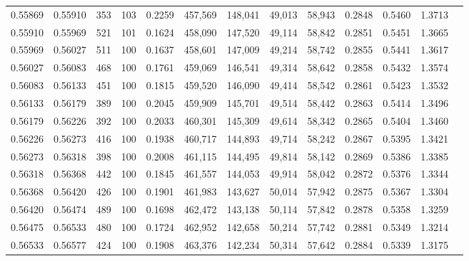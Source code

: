 \begin{tabular}{rrrrrrrrrrrrr}
0.55869 & 0.55910 &   353 & 103 &                                     0.2259 & 457,569 & 148,041 &  49,013 &  58,943 & 0.2848 & 0.5460 & 1.3713 \\
0.55910 & 0.55969 &   521 & 101 &                                     0.1624 & 458,090 & 147,520 &  49,114 &  58,842 & 0.2851 & 0.5451 & 1.3665 \\
0.55969 & 0.56027 &   511 & 100 &                                     0.1637 & 458,601 & 147,009 &  49,214 &  58,742 & 0.2855 & 0.5441 & 1.3617 \\
0.56027 & 0.56083 &   468 & 100 &                                     0.1761 & 459,069 & 146,541 &  49,314 &  58,642 & 0.2858 & 0.5432 & 1.3574 \\
0.56083 & 0.56133 &   451 & 100 &                                     0.1815 & 459,520 & 146,090 &  49,414 &  58,542 & 0.2861 & 0.5423 & 1.3532 \\
0.56133 & 0.56179 &   389 & 100 &                                     0.2045 & 459,909 & 145,701 &  49,514 &  58,442 & 0.2863 & 0.5414 & 1.3496 \\
0.56179 & 0.56226 &   392 & 100 &                                     0.2033 & 460,301 & 145,309 &  49,614 &  58,342 & 0.2865 & 0.5404 & 1.3460 \\
0.56226 & 0.56273 &   416 & 100 &                                     0.1938 & 460,717 & 144,893 &  49,714 &  58,242 & 0.2867 & 0.5395 & 1.3421 \\
0.56273 & 0.56318 &   398 & 100 &                                     0.2008 & 461,115 & 144,495 &  49,814 &  58,142 & 0.2869 & 0.5386 & 1.3385 \\
0.56318 & 0.56368 &   442 & 100 &                                     0.1845 & 461,557 & 144,053 &  49,914 &  58,042 & 0.2872 & 0.5376 & 1.3344 \\
0.56368 & 0.56420 &   426 & 100 &                                     0.1901 & 461,983 & 143,627 &  50,014 &  57,942 & 0.2875 & 0.5367 & 1.3304 \\
0.56420 & 0.56474 &   489 & 100 &                                     0.1698 & 462,472 & 143,138 &  50,114 &  57,842 & 0.2878 & 0.5358 & 1.3259 \\
0.56475 & 0.56533 &   480 & 100 &                                     0.1724 & 462,952 & 142,658 &  50,214 &  57,742 & 0.2881 & 0.5349 & 1.3214 \\
0.56533 & 0.56577 &   424 & 100 &                                     0.1908 & 463,376 & 142,234 &  50,314 &  57,642 & 0.2884 & 0.5339 & 1.3175 \\

\end{tabular}
